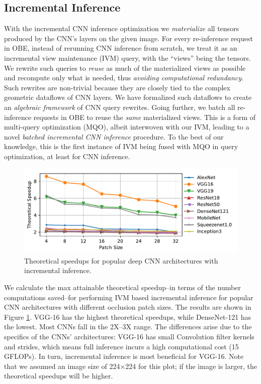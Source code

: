\documentclass{vldb}
\begin{document}
\subsection{Incremental Inference}
With the incremental CNN inference optimization we \textit{materialize} all tensors produced by the CNN's layers on the given image. For every re-inference request in OBE, instead of rerunning CNN inference from scratch, we treat it as an incremental view maintenance (IVM) query, with the ``views'' being the tensors. We rewrite such queries to \textit{reuse} as much of the materialized views as possible and recompute only what is needed, thus \textit{avoiding computational redundancy}. Such rewrites are non-trivial because they are closely tied to the complex geometric dataflows of CNN layers. We have formalized such dataflows to create an \textit{algebraic framework} of CNN query rewrites. Going further, we batch all re-inference requests in OBE to reuse the \textit{same} materialized views. This is a form of multi-query optimization (MQO), albeit interwoven with our IVM, leading to a novel \textit{batched incremental CNN inference} procedure. To the best of our knowledge, this is the first instance of IVM being fused with MQO in query optimization, at least for CNN inference.

\begin{figure}
\includegraphics[width=\columnwidth]{images/redundancy_ratio.pdf}
\caption{Theoretical speedups for popular deep CNN architectures with incremental inference.}
\label{fig:theoretical_speedups}
\end{figure}

We calculate the max attainable theoretical speedup--in terms of the number computations saved--for performing IVM based incremental inference for popular CNN architectures with different occlusion patch sizes.
The results are shown in Figure \ref{fig:theoretical_speedups}.
VGG-16 has the highest theoretical speedups, while DenseNet-121 has the lowest. Most CNNs fall in the 2X–3X range.
The differences arise due to the specifics of the CNNs’ architectures: VGG-16 has small Convolution filter kernels and strides, which means full inference incurs a high computational cost (15 GFLOPs). In turn, incremental inference is most beneficial for VGG-16.
Note that we assumed an image size of 224$\times$224 for this plot; if the image is larger, the theoretical speedups will be higher.
\end{document}
